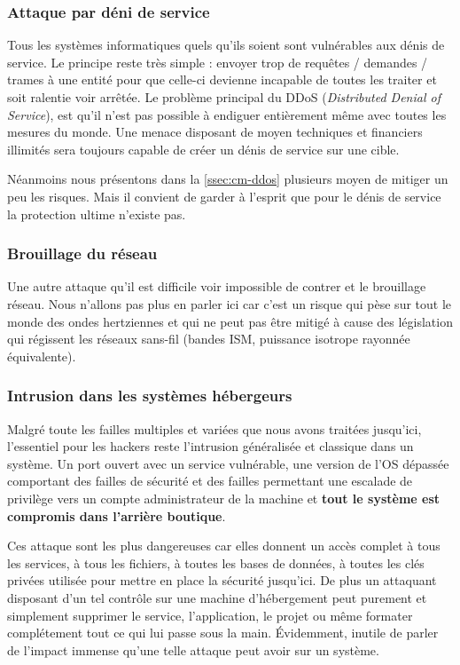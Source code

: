 \subsubsection{Attaque par déni de service}

Tous les systèmes informatiques quels qu'ils soient sont vulnérables aux dénis de service. Le principe reste très simple : envoyer trop de requêtes / demandes / trames à une entité pour que celle-ci devienne incapable de toutes les traiter et soit ralentie voir arrêtée. Le problème principal du DDoS (\emph{Distributed Denial of Service}), est qu'il n'est pas possible à endiguer entièrement même avec toutes les mesures du monde. Une menace disposant de moyen techniques et financiers illimités sera toujours capable de créer un dénis de service sur une cible.

Néanmoins nous présentons dans la \autoref{ssec:cm-ddos} plusieurs moyen de mitiger un peu les risques. Mais il convient de garder à l'esprit que pour le dénis de service la protection ultime n'existe pas.

\subsubsection{Brouillage du réseau}

Une autre attaque qu'il est difficile voir impossible de contrer et le brouillage réseau. Nous n'allons pas plus en parler ici car c'est un risque qui pèse sur tout le monde des ondes hertziennes et qui ne peut pas être mitigé à cause des législation qui régissent les réseaux sans-fil (bandes ISM, puissance isotrope rayonnée équivalente).

\subsubsection{Intrusion dans les systèmes hébergeurs}

Malgré toute les failles multiples et variées que nous avons traitées jusqu'ici, l'essentiel pour les hackers reste l'intrusion généralisée et classique dans un système. Un port ouvert avec un service vulnérable, une version de l'OS dépassée comportant des failles de sécurité et des failles permettant une escalade de privilège vers un compte administrateur de la machine et \textbf{tout le système est compromis dans l'arrière boutique}. 

Ces attaque sont les plus dangereuses car elles donnent un accès complet à tous les services, à tous les fichiers, à toutes les bases de données, à toutes les clés privées utilisée pour mettre en place la sécurité jusqu'ici. De plus un attaquant disposant d'un tel contrôle sur une machine d'hébergement peut purement et simplement supprimer le service, l'application, le projet ou même formater complétement tout ce qui lui passe sous la main.  Évidemment, inutile de parler de l'impact immense qu'une telle attaque peut avoir sur un système.

